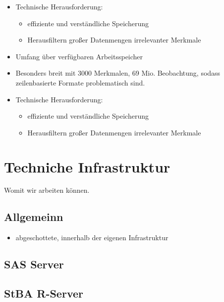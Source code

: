 \documentclass[
  german,
  10pt,
  twoside]{article}
\providecommand{\tightlist}{%
  \setlength{\itemsep}{0pt}\setlength{\parskip}{0pt}}
\begin{document}
\begin{itemize}
\item
  Technische Herausforderung:

  \begin{itemize}
  \tightlist
  \item
    effiziente und verständliche Speicherung
  \item
    Herausfiltern großer Datenmengen irrelevanter Merkmale
  \end{itemize}
\item
  Umfang über verfügbaren Arbeitsspeicher
\item
  Besonders breit mit 3000 Merkmalen, 69 Mio. Beobachtung, sodass
  zeilenbasierte Formate problematisch sind.
\item
  Technische Herausforderung:

  \begin{itemize}
  \tightlist
  \item
    effiziente und verständliche Speicherung
  \item
    Herausfiltern großer Datenmengen irrelevanter Merkmale
  \end{itemize}
\end{itemize}

\section{Techniche Infrastruktur}\label{sec-infrastruktur}

Womit wir arbeiten können.

\subsection{Allgemeinn}\label{allgemeinn}

\begin{itemize}
\tightlist
\item
  abgeschottete, innerhalb der eigenen Infrastruktur
\end{itemize}

\subsection{SAS Server}\label{sas-server}

\subsection{StBA R-Server}\label{stba-r-server}
\end{document}
